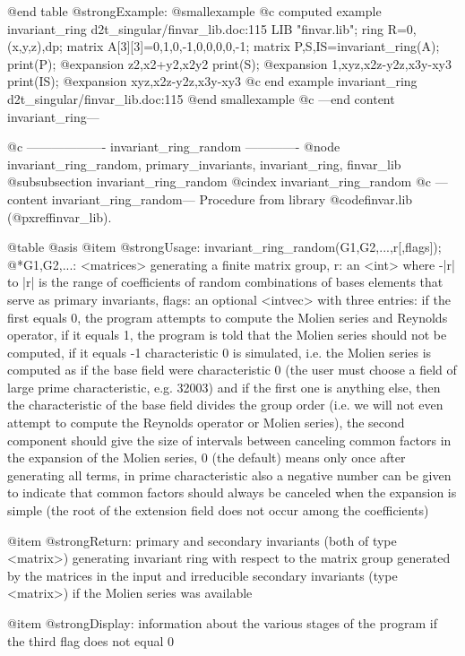@end table
@strong{Example:}
@smallexample
@c computed example invariant_ring d2t_singular/finvar_lib.doc:115 
LIB "finvar.lib";
ring R=0,(x,y,z),dp;
matrix A[3][3]=0,1,0,-1,0,0,0,0,-1;
matrix P,S,IS=invariant_ring(A);
print(P);
@expansion{} z2,x2+y2,x2y2
print(S);
@expansion{} 1,xyz,x2z-y2z,x3y-xy3
print(IS);
@expansion{} xyz,x2z-y2z,x3y-xy3
@c end example invariant_ring d2t_singular/finvar_lib.doc:115
@end smallexample
@c ---end content invariant_ring---

@c ------------------- invariant_ring_random -------------
@node invariant_ring_random, primary_invariants, invariant_ring, finvar_lib
@subsubsection invariant_ring_random
@cindex invariant_ring_random
@c ---content invariant_ring_random---
Procedure from library @code{finvar.lib} (@pxref{finvar_lib}).

@table @asis
@item @strong{Usage:}
invariant_ring_random(G1,G2,...,r[,flags]);
@*G1,G2,...: <matrices> generating a finite matrix group, r: an <int>
where -|r| to |r| is the range of coefficients of random
combinations of bases elements that serve as primary invariants,
flags: an optional <intvec> with three entries: if the first equals 0,
the program attempts to compute the Molien series and Reynolds
operator, if it equals 1, the program is told that the Molien series
should not be computed, if it equals -1 characteristic 0 is simulated,
i.e. the Molien series is computed as if the base field were
characteristic 0 (the user must choose a field of large prime
characteristic, e.g. 32003) and if the first one is anything else,
then the characteristic of the base field divides the group order
(i.e. we will not even attempt to compute the Reynolds operator or
Molien series), the second component should give the size of intervals
between canceling common factors in the expansion of the Molien
series, 0 (the default) means only once after generating all terms,
in prime characteristic also a negative number can be given to
indicate that common factors should always be canceled when the
expansion is simple (the root of the extension field does not occur
among the coefficients)

@item @strong{Return:}
primary and secondary invariants (both of type <matrix>) generating
invariant ring with respect to the matrix group generated by the
matrices in the input and irreducible secondary invariants (type
<matrix>) if the Molien series was available

@item @strong{Display:}
information about the various stages of the program if the third flag
does not equal 0

